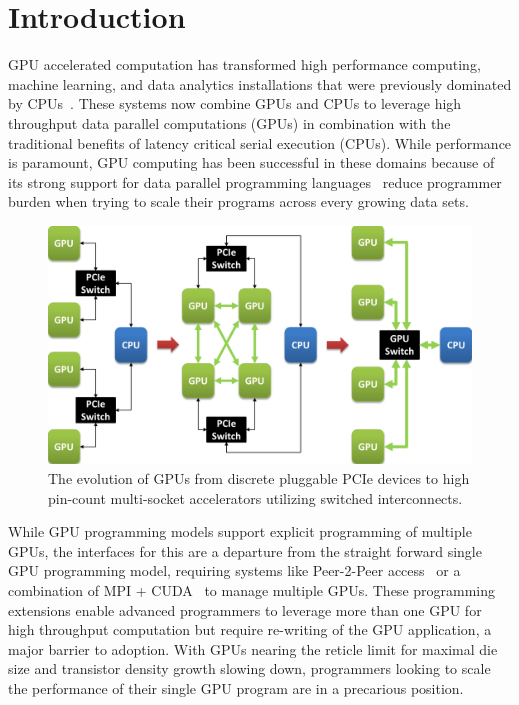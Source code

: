 \section{Introduction}
\label{introduction}
GPU accelerated computation has transformed high performance computing,
machine learning, and data analytics installations that were previously
dominated by CPUs~\cite{pascal,intersect360,cudnn,Lavin15b,SimonyanZ14a}.
These systems now combine GPUs and CPUs to leverage high throughput data parallel
computations (GPUs) in combination with the traditional benefits of latency critical
serial execution (CPUs).  While performance is paramount, GPU computing has been 
successful in these domains because of its strong support for 
data parallel programming languages~\cite{CUDA7,OPENCL} reduce programmer burden
when trying to scale their programs across every growing data sets.

\begin{figure}[t]
\centering
\includegraphics[width=1.0\columnwidth]{figures/inter_gpu_connections.pdf}
\caption{The evolution of GPUs from discrete pluggable PCIe devices to high pin-count 
multi-socket accelerators utilizing switched interconnects.}
\label{fig:systemdiagram}
\vspace{-.15in}
\end{figure}

While GPU programming models support explicit programming of multiple GPUs, the 
interfaces for this are a departure from the straight forward single GPU 
programming model, requiring systems like Peer-2-Peer access~\cite{NVIDIAP2P} 
or a combination of MPI + CUDA~\cite{NVIDIAMPI} to manage multiple GPUs.  These 
programming extensions enable advanced programmers to leverage more than one 
GPU for high throughput computation but require re-writing of the GPU 
application, a major barrier to adoption.  With GPUs nearing the reticle limit 
for maximal die size and transistor density growth slowing down, programmers 
looking to scale the performance of their single GPU program are in a precarious 
position.

